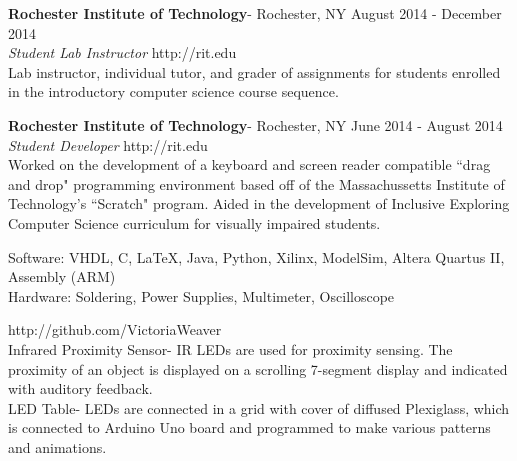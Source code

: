 \documentclass[10pt]{article} %
\begin{document}
	\medskip

	\noindent \textbf{Rochester Institute of Technology}- Rochester, NY 		\hfill August 2014 - December 2014 \\
	\textit{Student Lab Instructor}								\hfill http://rit.edu \\
	\indent Lab instructor, individual tutor, and grader of assignments for students enrolled in the introductory computer science course sequence.
	
	\medskip

	\noindent \textbf{Rochester Institute of Technology}- Rochester, NY 	\hfill June 2014 - August 2014 \\
	\textit{Student Developer}									\hfill http://rit.edu \\
	\indent Worked on the development of a keyboard and screen reader compatible ``drag and drop" programming environment based off of the Massachussetts Institute of Technology's ``Scratch" program.  Aided in the development of Inclusive Exploring Computer Science curriculum for visually impaired students.


\bigskip


\newline
	Software: VHDL, C, \LaTeX, Java, Python, Xilinx, ModelSim, Altera Quartus II, Assembly (ARM)\\
	Hardware: Soldering, Power Supplies, Multimeter, Oscilloscope

\bigskip


	\hfill http://github.com/VictoriaWeaver\\
\smallskip
	Infrared Proximity Sensor- IR LEDs are used for proximity sensing.  The proximity of an object is displayed on a scrolling 7-segment display and indicated with auditory feedback. \\

	\noindent LED Table- LEDs are connected in a grid with cover of diffused Plexiglass, which is connected to Arduino Uno board and programmed to make various patterns and animations.\\
\end{document}
